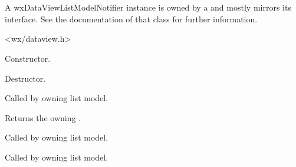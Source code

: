 
\section{}\label{wxdataviewlistmodelnotifier}

A wxDataViewListModelNotifier instance is owned by a
and mostly mirrors its interface. See the documentation
of that class for further information.




<wx/dataview.h>


\label{wxdataviewlistmodelnotifierwxdataviewlistmodelnotifier}


Constructor.

\label{wxdataviewlistmodelnotifierdtor}


Destructor.

\label{wxdataviewlistmodelnotifiercleared}


Called by owning list model.

\label{wxdataviewlistmodelnotifiergetowner}


Returns the owning .

\label{wxdataviewlistmodelnotifierrowappended}


Called by owning list model.

\label{wxdataviewlistmodelnotifierrowchanged}


Called by owning list model.

